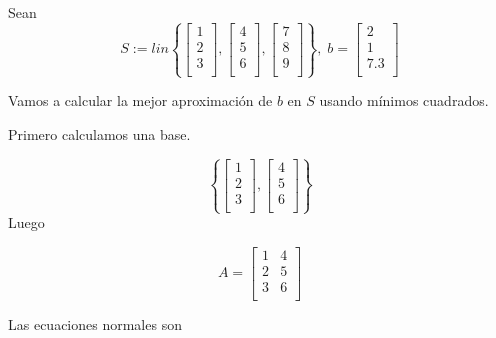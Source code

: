 \begin{ejemplo}
Sean
$$S := lin \left\lbrace \begin{bmatrix}
1 \\
2 \\
3 \\
\end{bmatrix}, 
\begin{bmatrix}
4 \\
5 \\
6 \\
\end{bmatrix},
\begin{bmatrix}
7 \\
8 \\
9 \\
\end{bmatrix}
\right\rbrace
,
\;
b = \begin{bmatrix}
2 \\
1 \\
7.3 \\
\end{bmatrix}$$

Vamos a calcular la mejor aproximación de $b$ en $S$ usando mínimos cuadrados.

Primero calculamos una base.

$$\left\lbrace \begin{bmatrix}
1 \\
2 \\
3 \\
\end{bmatrix}, 
\begin{bmatrix}
4 \\
5 \\
6 \\
\end{bmatrix}
\right\rbrace
$$
Luego 

$$A = \begin{bmatrix}
1 & 4\\
2 & 5\\
3 & 6\\
\end{bmatrix}$$

Las ecuaciones normales son


\end{ejemplo}
